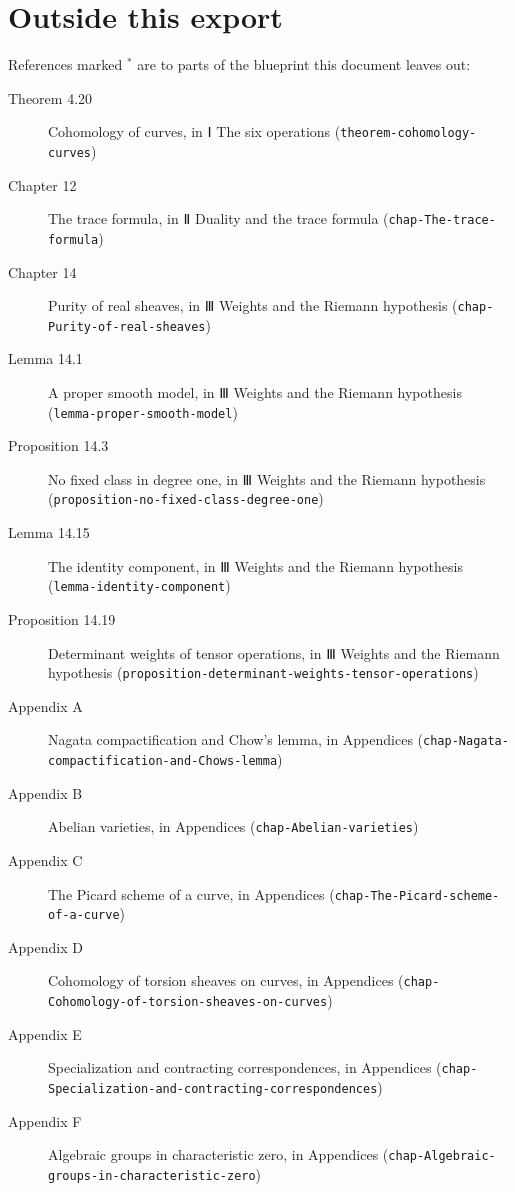 \documentclass[11pt]{article}
\newcommand{\bpslug}[1]{\texttt{#1}}
\begin{document}
\clearpage{}\hypertarget{bp-outside}{}%
\section*{Outside this export}
References marked \ensuremath{{}^\ast} are to parts of the blueprint this document leaves out:
\begin{description}
\item[Theorem 4.20] Cohomology of curves, in Ⅰ The six operations (\bpslug{theorem-{}\allowbreak{}cohomology-{}\allowbreak{}curves})
\item[Chapter 12] The trace formula, in Ⅱ Duality and the trace formula (\bpslug{chap-{}\allowbreak{}The-{}\allowbreak{}trace-{}\allowbreak{}formula})
\item[Chapter 14] Purity of real sheaves, in Ⅲ Weights and the Riemann hypothesis (\bpslug{chap-{}\allowbreak{}Purity-{}\allowbreak{}of-{}\allowbreak{}real-{}\allowbreak{}sheaves})
\item[Lemma 14.1] A proper smooth model, in Ⅲ Weights and the Riemann hypothesis (\bpslug{lemma-{}\allowbreak{}proper-{}\allowbreak{}smooth-{}\allowbreak{}model})
\item[Proposition 14.3] No fixed class in degree one, in Ⅲ Weights and the Riemann hypothesis (\bpslug{proposition-{}\allowbreak{}no-{}\allowbreak{}fixed-{}\allowbreak{}class-{}\allowbreak{}degree-{}\allowbreak{}one})
\item[Lemma 14.15] The identity component, in Ⅲ Weights and the Riemann hypothesis (\bpslug{lemma-{}\allowbreak{}identity-{}\allowbreak{}component})
\item[Proposition 14.19] Determinant weights of tensor operations, in Ⅲ Weights and the Riemann hypothesis (\bpslug{proposition-{}\allowbreak{}determinant-{}\allowbreak{}weights-{}\allowbreak{}tensor-{}\allowbreak{}operations})
\item[Appendix A] Nagata compactification and Chow's lemma, in Appendices (\bpslug{chap-{}\allowbreak{}Nagata-{}\allowbreak{}compactification-{}\allowbreak{}and-{}\allowbreak{}Chows-{}\allowbreak{}lemma})
\item[Appendix B] Abelian varieties, in Appendices (\bpslug{chap-{}\allowbreak{}Abelian-{}\allowbreak{}varieties})
\item[Appendix C] The Picard scheme of a curve, in Appendices (\bpslug{chap-{}\allowbreak{}The-{}\allowbreak{}Picard-{}\allowbreak{}scheme-{}\allowbreak{}of-{}\allowbreak{}a-{}\allowbreak{}curve})
\item[Appendix D] Cohomology of torsion sheaves on curves, in Appendices (\bpslug{chap-{}\allowbreak{}Cohomology-{}\allowbreak{}of-{}\allowbreak{}torsion-{}\allowbreak{}sheaves-{}\allowbreak{}on-{}\allowbreak{}curves})
\item[Appendix E] Specialization and contracting correspondences, in Appendices (\bpslug{chap-{}\allowbreak{}Specialization-{}\allowbreak{}and-{}\allowbreak{}contracting-{}\allowbreak{}correspondences})
\item[Appendix F] Algebraic groups in characteristic zero, in Appendices (\bpslug{chap-{}\allowbreak{}Algebraic-{}\allowbreak{}groups-{}\allowbreak{}in-{}\allowbreak{}characteristic-{}\allowbreak{}zero})
\end{description}
\end{document}
